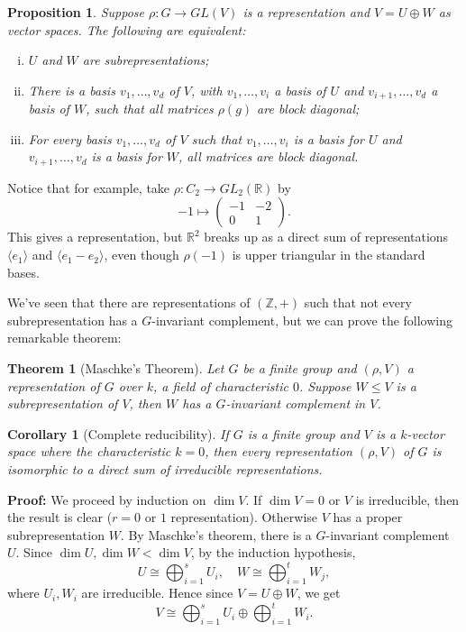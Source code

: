 \documentclass[12pt]{article}
\newtheorem{theorem}{Theorem}[section]
\newtheorem{corollary}{Corollary}[section]
\newtheorem{proposition}{Proposition}[section]
\theoremstyle{definition}
\theoremstyle{remark}
\begin{document}
\begin{proposition}
	Suppose $\rho : G \to GL(V)$ is a representation and $V = U \oplus W$ as vector spaces. The following are equivalent:
	\begin{enumerate}[(i)]
		\item $U$ and $W$ are subrepresentations;
		\item There is a basis $v_1, \ldots, v_d$ of $V$, with $v_1, \ldots, v_i$ a basis of $U$ and $v_{i+1}, \ldots, v_{d}$ a basis of $W$, such that all matrices $\rho(g)$ are block diagonal;
		\item For every basis $v_1, \ldots, v_d$ of $V$ such that $v_1, \ldots, v_i$ is a basis for $U$ and $v_{i+1}, \ldots, v_{d}$ is a basis for $W$, all matrices are block diagonal.
	\end{enumerate}
	
\end{proposition}

Notice that for example, take $\rho : C_2 \to GL_2(\mathbb{R})$ by
\[
-1 \mapsto
\begin{pmatrix}
	-1 & -2 \\
	0 & 1
\end{pmatrix}
.\]
This gives a representation, but $\mathbb{R}^2$ breaks up as a direct sum of representations $\langle e_1 \rangle$ and $\langle e_1 - e_2 \rangle$, even though $\rho(-1)$ is upper triangular in the standard bases.

We've seen that there are representations of $(\mathbb{Z}, +)$ such that not every subrepresentation has a $G$-invariant complement, but we can prove the following remarkable theorem:

\begin{theorem}[Maschke's Theorem]
	Let $G$ be a finite group and $(\rho, V)$ a representation of $G$ over $k$, a field of characteristic $0$. Suppose $W \leq V$ is a subrepresentation of $V$, then $W$ has a $G$-invariant complement in $V$.
\end{theorem}

\begin{corollary}[Complete reducibility]
	If $G$ is a finite group and $V$ is a $k$-vector space where the characteristic $k = 0$, then every representation $(\rho, V)$ of $G$ is isomorphic to a direct sum of irreducible representations.
\end{corollary}

\begin{adjustbox}{minipage = \columnwidth - 25.5pt, margin=1em, frame=1pt, margin=0em}
	\textbf{Proof:} We proceed by induction on $\dim V$. If $\dim V = 0$ or $V$ is irreducible, then the result is clear ($r = 0$ or $1$ representation). Otherwise $V$ has a proper subrepresentation $W$. By Maschke's theorem, there is a $G$-invariant complement $U$. Since $\dim U, \dim W < \dim V$, by the induction hypothesis,
	\[
	U \cong \bigoplus_{i = 1}^{s}U_i, \quad W \cong \bigoplus _{i = 1}^{t}W_j
	,\]
	where $U_i, W_i$ are irreducible. Hence since $V = U \oplus W$, we get
	\[
	V \cong \bigoplus _{i = 1}^{s} U_i \oplus \bigoplus_{i = 1}^{t} W_i
	.\]
\end{adjustbox}
\end{document}
